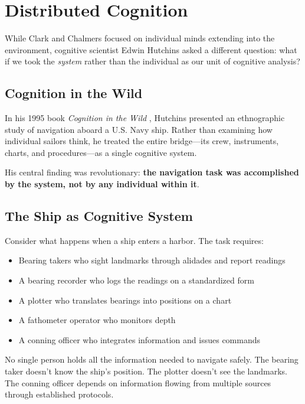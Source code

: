 \chapter{Distributed Cognition}

While Clark and Chalmers focused on individual minds extending into the environment, cognitive scientist Edwin Hutchins asked a different question: what if we took the \emph{system} rather than the individual as our unit of cognitive analysis?

\section{Cognition in the Wild}

In his 1995 book \emph{Cognition in the Wild} \cite{hutchins1995cognition}, Hutchins presented an ethnographic study of navigation aboard a U.S. Navy ship. Rather than examining how individual sailors think, he treated the entire bridge---its crew, instruments, charts, and procedures---as a single cognitive system.

His central finding was revolutionary: \textbf{the navigation task was accomplished by the system, not by any individual within it}.

\section{The Ship as Cognitive System}

Consider what happens when a ship enters a harbor. The task requires:

\begin{itemize}
    \item Bearing takers who sight landmarks through alidades and report readings
    \item A bearing recorder who logs the readings on a standardized form
    \item A plotter who translates bearings into positions on a chart
    \item A fathometer operator who monitors depth
    \item A conning officer who integrates information and issues commands
\end{itemize}

No single person holds all the information needed to navigate safely. The bearing taker doesn't know the ship's position. The plotter doesn't see the landmarks. The conning officer depends on information flowing from multiple sources through established protocols.

